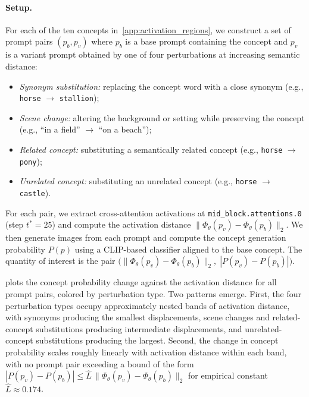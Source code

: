 \paragraph{Setup.}
For each of the ten concepts in~\cref{app:activation_regions}, we construct a set of prompt pairs $(p_b, p_v)$ where $p_b$ is a base prompt containing the concept and $p_v$ is a variant prompt obtained by one of four perturbations at increasing semantic distance:
\begin{itemize}
    \item \emph{Synonym substitution:} replacing the concept word with a close synonym (e.g., \texttt{horse} $\to$ \texttt{stallion});
    \item \emph{Scene change:} altering the background or setting while preserving the concept (e.g., ``in a field'' $\to$ ``on a beach'');
    \item \emph{Related concept:} substituting a semantically related concept (e.g., \texttt{horse} $\to$ \texttt{pony});
    \item \emph{Unrelated concept:} substituting an unrelated concept (e.g., \texttt{horse} $\to$ \texttt{castle}).
\end{itemize}
For each pair, we extract cross-attention activations at \texttt{mid\_block.attentions.0} (step $t^*{=}25$) and compute the activation distance $\|\Phi_\theta(p_v) - \Phi_\theta(p_b)\|_2$. We then generate images from each prompt and compute the concept generation probability $P(p)$ using a CLIP-based classifier aligned to the base concept. The quantity of interest is the pair $\bigl(\|\Phi_\theta(p_v) - \Phi_\theta(p_b)\|_2,\;|P(p_v) - P(p_b)|\bigr)$.

 plots the concept probability change against the activation distance for all prompt pairs, colored by perturbation type. Two patterns emerge. First, the four perturbation types occupy approximately nested bands of activation distance, with synonyms producing the smallest displacements, scene changes and related-concept substitutions producing intermediate displacements, and unrelated-concept substitutions producing the largest. Second, the change in concept probability scales roughly linearly with activation distance within each band, with no prompt pair exceeding a bound of the form $|P(p_v) - P(p_b)| \leq \hat{L} \,\|\Phi_\theta(p_v) - \Phi_\theta(p_b)\|_2$ for empirical constant $\hat{L} \approx 0.174$.

